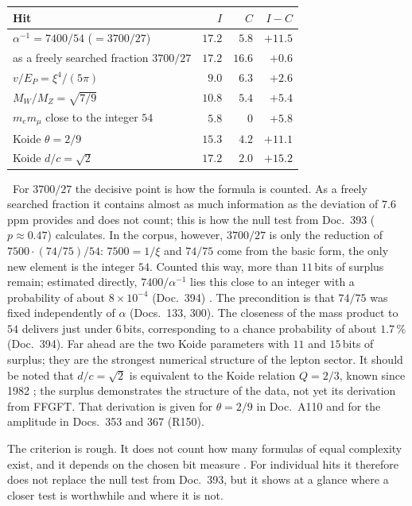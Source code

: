 \begin{center}
\begin{tabular}{@{}lrrr@{}}
\toprule
\textbf{Hit} & \textbf{$I$} & \textbf{$C$} & \textbf{$I-C$}\\
\midrule
$\alpha^{-1}=7400/54$ ($=3700/27$) & $17.2$ & $5.8$ & $+11.5$\\
\quad as a freely searched fraction $3700/27$ & $17.2$ & $16.6$ & $+0.6$\\
$v/E_P=\xi^4/(5\pi)$ & $9.0$ & $6.3$ & $+2.6$\\
$M_W/M_Z=\sqrt{7/9}$ & $10.8$ & $5.4$ & $+5.4$\\
$m_em_\mu$ close to the integer $54$ & $5.8$ & $0$ & $+5.8$\\
Koide $\theta=2/9$ & $15.3$ & $4.2$ & $+11.1$\\
Koide $d/c=\sqrt2$ & $17.2$ & $2.0$ & $+15.2$\\
\bottomrule
\end{tabular}
\end{center}
\KM\ For $3700/27$ the decisive point is how the formula is counted. As a freely searched fraction it
contains almost as much information as the deviation of $7.6$\,ppm provides and does not count; this
is how the null test from Doc.~393 ($p\approx0.47$) calculates. In the corpus, however, $3700/27$ is
only the reduction of $7500\cdot(74/75)/54$: $7500=1/\xi$ and $74/75$ come from the basic form, the
only new element is the integer $54$. Counted this way, more than $11$\,bits of surplus remain;
estimated directly, $7400/\alpha^{-1}$ lies this close to an integer with a probability of about
$8\times10^{-4}$ (Doc.~394) \KM. The precondition is that $74/75$ was fixed independently of $\alpha$
(Docs.~133, 300). The
closeness of the mass product to $54$ delivers just under $6$\,bits, corresponding to a chance
probability of about $1.7\,\%$ (Doc.~394). Far ahead are the two Koide parameters with $11$ and
$15$\,bits of surplus; they are the strongest numerical structure of the lepton sector. It should be
noted that $d/c=\sqrt2$ is equivalent to the Koide relation $Q=2/3$, known since 1982 \cite{Koide1982};
the surplus demonstrates the structure of the data, not yet its derivation from FFGFT. That
derivation is given for $\theta=2/9$ in Doc.~A110 and for the amplitude in Docs.~353 and 367 (R150).

The criterion is rough. It does not count how many formulas of equal complexity exist, and it depends
on the chosen bit measure \SM. For individual hits it therefore does not replace the null test from
Doc.~393, but it shows at a glance where a closer test is worthwhile and where it is not.

